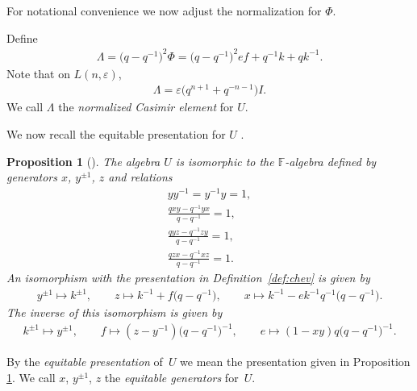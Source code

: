 \documentclass[11pt]{article}
\numberwithin{equation}{section}
\newtheorem{Proposition}[Theorem]{Proposition}
{\theoremstyle{definition}
\newtheorem{Note}[Theorem]{Note}
\newtheorem{Definition}[Theorem]{Definition}
\newtheorem{Problem}[Theorem]{Problem}
}
\begin{document}
For notational convenience we now adjust the
normalization for $\Phi$.

\begin{Definition}
\label{def:norm}
Def\/ine
\begin{gather}
\Lambda  = \big(q-q^{-1}\big)^2 \Phi
= \big(q-q^{-1}\big)^2ef +q^{-1}k + qk^{-1}.
\label{eq:lambdaform}
\end{gather}
Note that on
$L(n,\varepsilon)$,
\begin{gather*}
\Lambda  =  \varepsilon\big(q^{n+1}+q^{-n-1}\big)I.
\end{gather*}
We call
$\Lambda$ the {\it normalized Casimir element} for
$U$.
\end{Definition}


We now recall the equitable presentation for
$U$ \cite{equit}.

\begin{Proposition}[]
\label{prop:equit}
The algebra
$U$ is isomorphic to the
$\mathbb F$-algebra defined by generators
$x$, $y^{\pm 1}$, $z$ and relations
\begin{gather}
 y y^{-1} = y^{-1} y  = 1,
\label{eq:eq0}
\\
 \frac{qxy-q^{-1}yx}{q-q^{-1}} = 1,
\label{eq:eq1}
\\
 \frac{qyz-q^{-1}zy}{q-q^{-1}} = 1,
\label{eq:eq2}
\\
 \frac{qzx-q^{-1}xz}{q-q^{-1}} = 1.
\label{eq:eq3}
\end{gather}
An isomorphism with the presentation in
Definition~{\rm \ref{def:chev}} is given by
\begin{gather*}
 y^{\pm 1} \mapsto k^{\pm 1},
\qquad
 z \mapsto k^{-1} + f\big(q-q^{-1}\big),
\qquad
 x \mapsto k^{-1} - ek^{-1}q^{-1}\big(q-q^{-1}\big).
\end{gather*}
The inverse of this isomorphism is given by
\begin{gather*}
 k^{\pm 1} \mapsto y^{\pm 1},
\qquad
 f\mapsto (z-y^{-1})\big(q-q^{-1}\big)^{-1},
\qquad
 e\mapsto (1-xy)q\big(q-q^{-1}\big)^{-1}.
\end{gather*}
\end{Proposition}


\begin{Definition}
By the {\it equitable presentation} of~$U$ we mean the
presentation given in Proposition
\ref{prop:equit}. We call $x$, $y^{\pm 1}$, $z$ the
{\it equitable generators} for~$U$.
\end{Definition}
\end{document}
